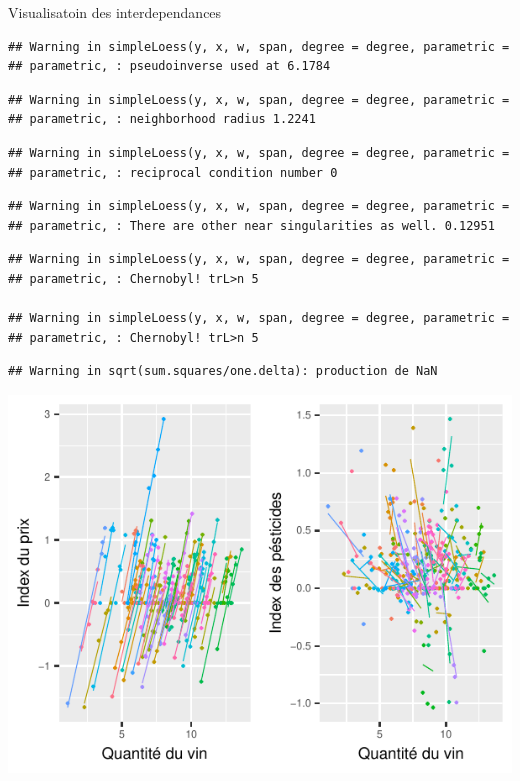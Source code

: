 \documentclass[11pt,ignorenonframetext,]{beamer}
\begin{document}
\begin{frame}[fragile]{Visualisatoin des interdependances}
\begin{verbatim}
## Warning in simpleLoess(y, x, w, span, degree = degree, parametric =
## parametric, : pseudoinverse used at 6.1784
\end{verbatim}

\begin{verbatim}
## Warning in simpleLoess(y, x, w, span, degree = degree, parametric =
## parametric, : neighborhood radius 1.2241
\end{verbatim}

\begin{verbatim}
## Warning in simpleLoess(y, x, w, span, degree = degree, parametric =
## parametric, : reciprocal condition number 0
\end{verbatim}

\begin{verbatim}
## Warning in simpleLoess(y, x, w, span, degree = degree, parametric =
## parametric, : There are other near singularities as well. 0.12951
\end{verbatim}

\begin{verbatim}
## Warning in simpleLoess(y, x, w, span, degree = degree, parametric =
## parametric, : Chernobyl! trL>n 5

## Warning in simpleLoess(y, x, w, span, degree = degree, parametric =
## parametric, : Chernobyl! trL>n 5
\end{verbatim}

\begin{verbatim}
## Warning in sqrt(sum.squares/one.delta): production de NaN
\end{verbatim}

\includegraphics{Presentation_files/figure-beamer/unnamed-chunk-12-1.pdf}

\end{frame}
\end{document}

